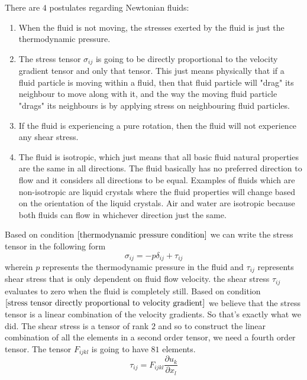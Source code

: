 
There are $4$ postulates regarding Newtonian fluids:
\begin{enumerate}
\item When the fluid is not moving, the stresses exerted by the fluid is just the thermodynamic pressure.\label{thermodynamic pressure condition}
\item The stress tensor $\sigma_{ij}$ is going to be directly proportional to the velocity gradient tensor and only that tensor.
This just means physically that if a fluid particle is moving within a fluid, then that fluid particle will "drag" its neighbour to move along with it, and the way the moving fluid particle "drags" its neighbours is by applying stress on neighbouring fluid particles. \label{stress tensor directly proportional to velocity gradient}
\item If the fluid is experiencing a pure rotation, then the fluid will not experience any shear stress. \label{pure rotation no shear stress}
\item The fluid is isotropic, which just means that all basic fluid natural properties are the same in all directions. 
The fluid basically has no preferred direction to flow and it considers all directions to be equal.
Examples of fluids which are non-isotropic are liquid crystals where the fluid properties will change based on the orientation of the liquid crystals.
Air and water are isotropic because both fluids can flow in whichever direction just the same. \label{isotropy condition fluid shear stress}
\end{enumerate}
Based on condition $\ref{thermodynamic pressure condition}$ we can write the stress tensor in the following form
\begin{equation}\sigma_{ij} = -p\delta_{ij} + \tau_{ij} \label{Stress Tensor Constitutive Relation Fluid Momentum}\end{equation}
wherein $p$ represents the thermodynamic pressure in the fluid and $\tau_{ij}$ represents shear stress that is only dependent on fluid flow velocity.
the shear stress $\tau_{ij}$ evaluates to zero when the fluid is completely still.
Based on condition $\ref{stress tensor directly proportional to velocity gradient}$ we believe that the stress tensor is a linear combination of the velocity gradients.
So that's exactly what we did.
The shear stress is a tensor of rank $2$ and so to construct the linear combination of all the elements in a second order tensor, we need a fourth order tensor.
The tensor $F_{ijkl}$ is going to have $81$ elements.
$$\tau_{ij} = F_{ijkl}\frac{\partial u_{k}}{\partial x_{l}}$$
